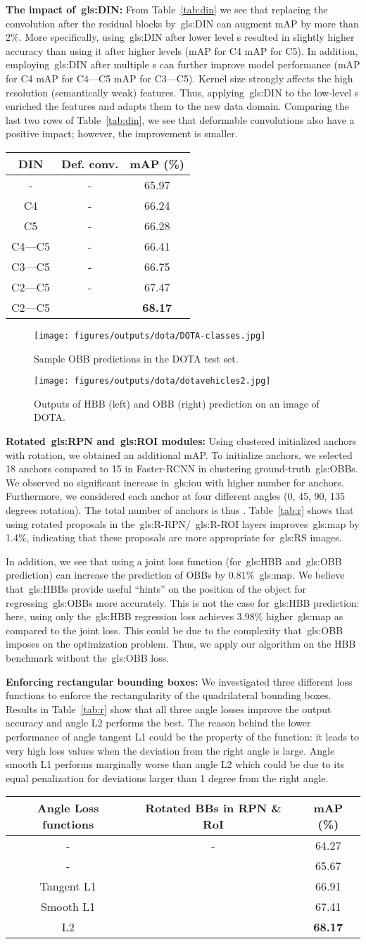 \documentclass[runningheads]{llncs}
\newcommand{\dotaclassesfigure}{
	\begin{figure}[t]
		\centering
		\texttt{[image: figures/outputs/dota/DOTA-classes.jpg]}
		\caption{Sample OBB predictions in the DOTA test set.}
		\label{fig:DOTA-classes}
	\end{figure}
}
\newcommand{\dotavehiclesfigure}{
\begin{figure}[t]
		\centering
		\texttt{[image: figures/outputs/dota/dotavehicles2.jpg]}
		\caption{Outputs of HBB (left) and OBB (right) prediction on an image of DOTA.}
		\label{fig:dotavehicles}
	\end{figure}
}
\newcommand{\dintable}{
		\begin{table*}[t]
		\centering
		\caption{Evaluation of employing DIN after certain residual blocks  with and without deformable convolutions on the validation set of DOTA.}
		\label{tab:din}
		\begin{tabular}{c|c|c}
			DIN & Def. conv. & mAP (\%) \\
			\midrule
			-  & - &65.97\\
			C4  & - &66.24\\
			C5  & - &66.28\\						
			C4---C5  & - & 66.41\\					
			C3---C5 & - & 66.75\\							
			C2---C5 & - & 67.47\\
			C2---C5 & \checkmark & \textbf{68.17}\\		
		\end{tabular}
	\end{table*}
}
\newcommand{\rpnroitable}{
	\begin{table*}[t]
    \centering
		\caption{Evaluation of (1) the impact of rotated RPN and RoI and (2) the effect of the loss functions enforcing the rectangularity of the bounding boxes.}
		\label{tab:r}
		\begin{tabular}{c|c|c}
			Angle Loss functions & Rotated BBs in RPN \& RoI & mAP (\%) \\
			\midrule
			-  & - & 64.27\\
			- & \checkmark & 65.67\\
            \midrule
			 Tangent L1  & \checkmark & 66.91\\
			 Smooth L1  & \checkmark & 67.41\\
			 L2 & \checkmark & \textbf{68.17}\\	
		\end{tabular}
	\end{table*}
}
\begin{document}
  \icntable
	\textbf{The impact of~\gls{gls:DIN}:}
	From Table~\ref{tab:din} we see that replacing the  convolution after the residual blocks  by~\gls{gls:DIN} can augment mAP by more than 2\%.
	More specifically, using~\gls{gls:DIN} after lower level s resulted in slightly higher accuracy than using it after higher levels (\eg mAP for C4  mAP for C5). In addition, employing~\gls{gls:DIN} after multiple s can further improve model performance (\eg mAP for C4  mAP for C4---C5  mAP for C3---C5). 
    Kernel size strongly affects the high resolution (semantically weak) features. Thus, applying~\gls{gls:DIN} to the low-level s enriched the features and adapts them to the new data domain.
    Comparing the last two rows of Table~\ref{tab:din}, we see that deformable convolutions also have a positive impact; however, the improvement is smaller.
    
\dintable
\dotaclassesfigure
\dotavehiclesfigure
	\textbf{Rotated~\gls{gls:RPN} and~\gls{gls:ROI} modules:}
    Using clustered initialized anchors with rotation, we obtained an additional  mAP.
    To initialize anchors, we selected 18 anchors compared to 15 in Faster-RCNN in clustering ground-truth~\glspl{gls:OBB}.
	We observed no significant increase in~\gls{gls:iou} with higher number for anchors.
	Furthermore, we considered each anchor at four different angles (0, 45, 90, 135 degrees rotation).
    The total number of anchors is thus .
    Table~\ref{tab:r} shows that using rotated proposals in the~\gls{gls:R-RPN}/~\gls{gls:R-ROI} layers improves~\gls{gls:map} by 1.4\%, indicating that these proposals are more appropriate for~\gls{gls:RS} images.
    
	In addition, we see that using a joint loss function (for~\gls{gls:HBB} and~\gls{gls:OBB} prediction) can increase the prediction of OBBs by 0.81\%~\gls{gls:map}.
    We believe that~\glspl{gls:HBB} provide useful ``hints'' on the position of the object for regressing~\glspl{gls:OBB} more accurately.
    This is not the case for~\gls{gls:HBB} prediction: here, using only the~\gls{gls:HBB} regression loss achieves 3.98\% higher~\gls{gls:map} as compared to the joint loss. This could be due to the complexity that~\gls{gls:OBB} imposes on the optimization problem.
    Thus, we apply our algorithm on the HBB benchmark without the~\gls{gls:OBB} loss.
	
	\textbf{Enforcing rectangular bounding boxes:} We investigated three different loss functions to enforce the rectangularity of the quadrilateral bounding boxes.
	Results in Table~\ref{tab:r} show that all three angle losses improve the output accuracy and angle L2 performs the best.
		The reason behind the lower performance of angle tangent L1 could be the property of the  function: it leads to very high loss values when the deviation from the right angle is large.
	Angle smooth L1 performs marginally worse than angle L2 which could be due to its equal penalization for deviations larger than 1 degree from the right angle.
\rpnroitable
\end{document}
